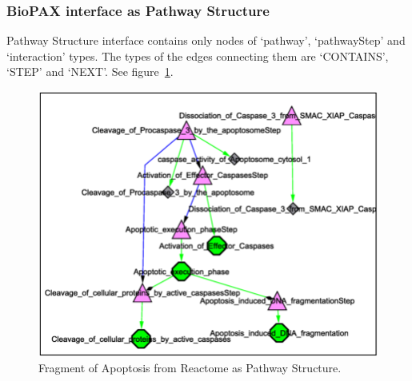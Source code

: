 \subsubsection{BioPAX interface as Pathway Structure}
Pathway Structure interface contains only nodes of ‘pathway’, ‘pathwayStep’ and ‘interaction’ types. The types of the edges connecting them are ‘CONTAINS’, ‘STEP’ and ‘NEXT’.  See figure~\ref{BioPAX_pathway_structure}.
\begin{figure}
\centering
\includegraphics[width=16 cm]{graphics/BioPAX_pathway_structure}
\caption{Fragment of Apoptosis from Reactome as Pathway Structure.}
\label{BioPAX_pathway_structure}
\end{figure}
